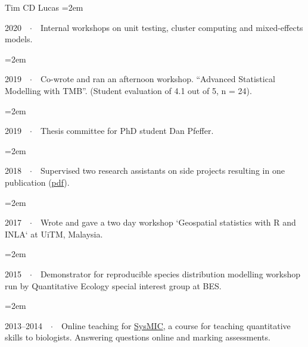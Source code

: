 \documentclass{scrartcl}
\newcommand{\Description}[1]{\hangindent=2em\hangafter=0\noindent\raggedright\footnotesize{#1}\par\normalsize\vspace{1em}} %
\begin{document}
\begin{cv}{Tim {\Large CD} Lucas}
\Description{2020\ \ $\cdotp$\ \ Internal workshops on unit testing, cluster computing and mixed-effects models.}
\vspace{-0.5em} %

\Description{2019\ \ $\cdotp$\ \ Co-wrote and ran an afternoon workshop. ``Advanced Statistical Modelling with TMB''. (Student evaluation of 4.1 out of 5, n = 24).}
\vspace{-0.5em} %

\Description{2019\ \ $\cdotp$\ \ Thesis committee for PhD student Dan Pfeffer.}
\vspace{-0.5em} %

\Description{2018\ \ $\cdotp$\ \ Supervised two research assistants on side projects resulting in one publication (\href{https://malariajournal.biomedcentral.com/track/pdf/10.1186/s12936-018-2500-5}{pdf}).}
\vspace{-0.5em} %

\Description{2017\ \ $\cdotp$\ \ Wrote and gave a two day workshop `Geospatial statistics with R and INLA` at UiTM, Malaysia.}
\vspace{-0.5em} %


\Description{2015\ \ $\cdotp$\ \ Demonstrator for reproducible species distribution modelling workshop run by Quantitative Ecology special interest group at BES.}
\vspace{-0.5em} %

\Description{2013--2014\ \ $\cdotp$\ \ Online teaching for \href{http://sysmic.ac.uk/home.html}{{\footnotesize SysMIC}}, a course for teaching quantitative skills to biologists. Answering questions online and marking assessments.}

\vspace{1em} %






\end{cv}
\end{document}
